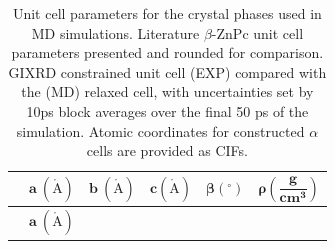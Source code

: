 \begin{longtable}[]{@{}
  >{\centering\arraybackslash}p{}
  >{\centering\arraybackslash}p{}
  >{\centering\arraybackslash}p{}
  >{\centering\arraybackslash}p{}
  >{\centering\arraybackslash}p{}
  >{\centering\arraybackslash}p{}@{}}
\caption{Unit cell parameters for the crystal phases used in MD simulations. Literature \(\beta\)-ZnPc unit cell parameters presented and rounded for comparison.\autocite{mai2020data} GIXRD constrained unit cell (EXP) compared with the (MD) relaxed cell, with uncertainties set by 10ps block averages over the final 50 ps of the simulation. Atomic coordinates for constructed \(\alpha\) cells are provided as CIFs.}\label{tab:S3}\tabularnewline
\toprule\noalign{}
\begin{minipage}[b]{\linewidth}\centering
\end{minipage} & \begin{minipage}[b]{\linewidth}\centering
\[\mathbf{a\ }\left( \mathbf{\mathring{\mathrm{A}}} \right)\]
\end{minipage} & \begin{minipage}[b]{\linewidth}\centering
\[\mathbf{b\ }\left( \mathbf{\mathring{\mathrm{A}}} \right)\]
\end{minipage} & \begin{minipage}[b]{\linewidth}\centering
\[\mathbf{c}\left( \mathbf{\mathring{\mathrm{A}}} \right)\]
\end{minipage} & \begin{minipage}[b]{\linewidth}\centering
\[\mathbf{\beta}\left( \mathbf{{^\circ}} \right)\]
\end{minipage} & \begin{minipage}[b]{\linewidth}\centering
\[\mathbf{\rho}\left( \frac{\mathbf{g}}{\mathbf{c}\mathbf{m}^{\mathbf{3}}} \right)\]
\end{minipage} \\
\midrule\noalign{}
\endfirsthead
\toprule\noalign{}
\begin{minipage}[b]{\linewidth}\centering
\end{minipage} & \begin{minipage}[b]{\linewidth}\centering
\[\mathbf{a\ }\left( \mathbf{\mathring{\mathrm{A}}} \right)\]
\end{minipage} & \begin{minipage}[b]{\linewidth}\centering

\end{minipage}
\end{longtable}
